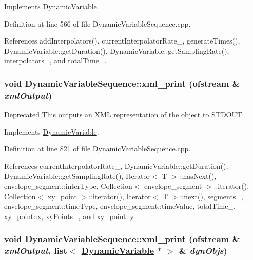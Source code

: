 Implements \hyperlink{classDynamicVariable_a3}{Dynamic\-Variable}.

Definition at line 566 of file Dynamic\-Variable\-Sequence.cpp.

References add\-Interpolators(), current\-Interpolator\-Rate\_\-, generate\-Times(), Dynamic\-Variable::get\-Duration(), Dynamic\-Variable::get\-Sampling\-Rate(), interpolators\_\-, and total\-Time\_\-.\hypertarget{classDynamicVariableSequence_a28}{
\subsubsection[xml\_\-print]{\setlength{\rightskip}{0pt plus 5cm}void Dynamic\-Variable\-Sequence::xml\_\-print (ofstream \& {\em xml\-Output})}}
\label{classDynamicVariableSequence_a28}


\begin{Desc}
\item[\hyperlink{deprecated__deprecated000011}{Deprecated}]This outputs an XML representation of the object to STDOUT \end{Desc}


Implements \hyperlink{classDynamicVariable_a12}{Dynamic\-Variable}.

Definition at line 821 of file Dynamic\-Variable\-Sequence.cpp.

References current\-Interpolator\-Rate\_\-, Dynamic\-Variable::get\-Duration(), Dynamic\-Variable::get\-Sampling\-Rate(), Iterator$<$ T $>$::has\-Next(), envelope\_\-segment::inter\-Type, Collection$<$ envelope\_\-segment $>$::iterator(), Collection$<$ xy\_\-point $>$::iterator(), Iterator$<$ T $>$::next(), segments\_\-, envelope\_\-segment::time\-Type, envelope\_\-segment::time\-Value, total\-Time\_\-, xy\_\-point::x, xy\-Points\_\-, and xy\_\-point::y.\hypertarget{classDynamicVariableSequence_a27}{
\subsubsection[xml\_\-print]{\setlength{\rightskip}{0pt plus 5cm}void Dynamic\-Variable\-Sequence::xml\_\-print (ofstream \& {\em xml\-Output}, list$<$ \hyperlink{classDynamicVariable}{Dynamic\-Variable} $\ast$ $>$ \& {\em dyn\-Objs})}}
\label{classDynamicVariableSequence_a27}


